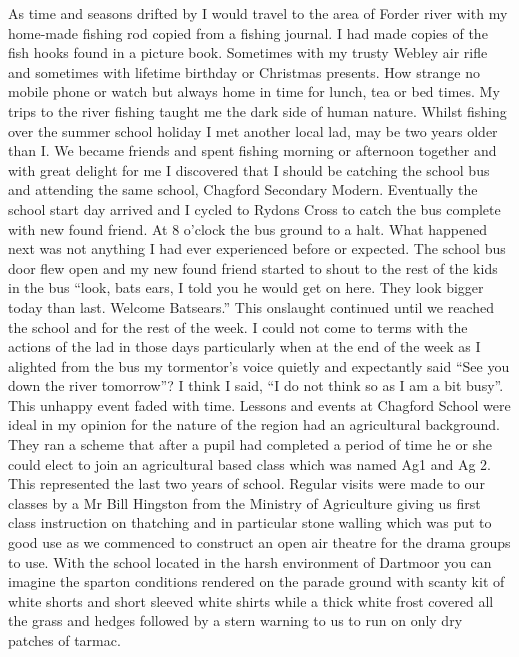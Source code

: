 
\here
As time and seasons drifted by I would travel to the area of Forder river with
my home-made fishing rod copied from a fishing journal. I had made copies of
the fish hooks found in a picture book. Sometimes with my trusty Webley air
rifle and sometimes with lifetime birthday or Christmas presents. How strange
no mobile phone or watch but always home in time for lunch, tea or bed times.
My trips to the river fishing taught me the dark side of human nature. Whilst
fishing over the summer school holiday I met another local lad, may be two
years older than I. We became friends and spent fishing morning or afternoon
together and with great delight for me I discovered that I should be catching
the school bus and attending the same school, Chagford Secondary Modern.
Eventually the school start day arrived and I cycled to Rydons Cross to catch
the bus complete with new found friend. At 8 o'clock the bus ground to a halt.
What happened next was not anything I had ever experienced before or expected.
The school bus door flew open and my new found friend started to shout to the
rest of the kids in the bus ``look, bats ears, I told you he would get on here.
They look bigger today than last. Welcome Batsears.'' This onslaught continued
until we reached the school and for the rest of the week. I could not come to
terms with the actions of the lad in those days particularly when at the end of
the week as I alighted from the bus my tormentor's voice quietly and
expectantly said ``See you down the river tomorrow''? I think I said, ``I do
not think so as I am a bit busy''. This unhappy event faded with time. Lessons
and events at Chagford School were ideal in my opinion for the nature of the
region had an agricultural background. They ran a scheme that after a pupil had
completed a period of time he or she could elect to join an agricultural based
class which was named Ag1 and Ag 2. This represented the last two years of
school. Regular visits were made to our classes by a Mr Bill Hingston from the
Ministry of Agriculture giving us first class instruction on thatching and in
particular stone walling which was put to good use as we commenced to construct
an open air theatre for the drama groups to use. With the school located in
the harsh environment of Dartmoor you can imagine the sparton conditions
rendered on the parade ground with scanty kit of white shorts and short sleeved
white shirts while a thick white frost covered all the grass and hedges
followed by a stern warning to us to run on only dry patches of tarmac.
